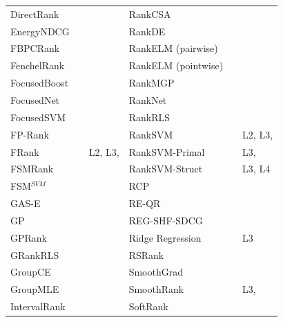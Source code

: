 \documentclass{sig-alternate-2013}
\begin{document}
\begin{table}[!h!p]
\begin{tabular}{|l|l|l||l|l|l|}
DirectRank & \cite{Tan2013} & \cite{Tan2013} & RankCSA & \cite{He2010} & \cite{He2010} \\ 
EnergyNDCG & \cite{Freno2011} & \cite{Freno2011} & RankDE & \cite{Bollegala2011} & \cite{Sato2013} \\ 
FBPCRank & \cite{Lai2011} & \cite{Lai2011} & RankELM (pairwise) & \cite{Zong2013} & \cite{Zong2013} \\ 
FenchelRank & \cite{Lai2013} & \cite{Lai2013, Lai2013b, Laporte2013} & RankELM (pointwise) & \cite{Zong2013} & \cite{Zong2013} \\ 
FocusedBoost & \cite{Niu2012} & \cite{Niu2012} & RankMGP & \cite{Lin2012} & \cite{Lin2012} \\ 
FocusedNet & \cite{Niu2012} & \cite{Niu2012} & RankNet & \cite{Burges2005} & \cite{Busa-Fekete2013, Papini2012, Niu2012} \\ 
FocusedSVM & \cite{Niu2012} & \cite{Niu2012} & RankRLS & \cite{Pahikkala2009} & \cite{Pahikkala2010} \\ 
FP-Rank & \cite{Song2013} & \cite{Song2013} & RankSVM & \cite{Herbrich1999, Joachims2002} & L2, L3, \cite{Busa-Fekete2013, Freno2011, He2010, Alcantara2010} \\ 
FRank & \cite{Tsai2007} & L2, L3, \cite{Wang2012} & RankSVM-Primal &  & L3, \cite{Lai2011} \\ 
FSMRank & \cite{Lai2013c} & \cite{Lai2013c,Laporte2013} & RankSVM-Struct &  & L3, L4 \\
FSM$^{SVM}$ & \cite{Lai2013c} & \cite{Lai2013c} & RCP & \cite{Elsas2008} & \cite{Elsas2008} \\ 
GAS-E & \cite{Geng2007} & \cite{Lai2013c} & RE-QR & \cite{Veloso2010} & \cite{Veloso2010} \\
GP & \cite{DeAlmeida2007} & \cite{Alcantara2010} & REG-SHF-SDCG & \cite{Wu2009} & \cite{Wu2009} \\  
GPRank & \cite{Silva2009} & \cite{Torkestani2012} & Ridge Regression & \cite{Cossock2006} & L3 \\
GRankRLS & \cite{Pahikkala2010} & \cite{Pahikkala2010} & RSRank & \cite{Sun2009} & \cite{Lai2013} \\ 
GroupCE & \cite{Lin2011} & \cite{Lin2011} & SmoothGrad & \cite{Le2007} & \cite{Tan2013} \\ 
GroupMLE & \cite{Lin2010} & \cite{Lin2011} & SmoothRank & \cite{Chapelle2010} & L3, \cite{Chapelle2010} \\
IntervalRank & \cite{Moon2010} & \cite{Moon2010, Freno2011} & SoftRank & \cite{Taylor2008, Guiver2008} & \cite{Qin2010b} \\ 

\end{tabular}
\end{table}
\end{document}
